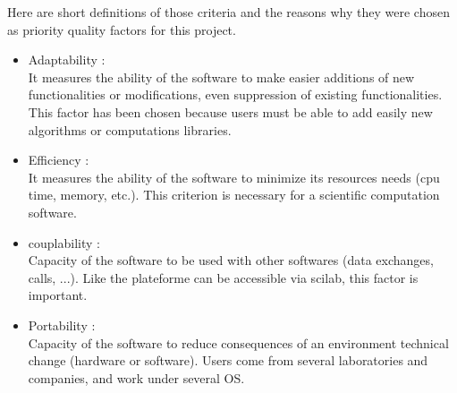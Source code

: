 Here are short definitions of those criteria and the reasons why they were chosen as priority quality factors for this project.

\begin{itemize}
\item   Adaptability : \\
        It measures the ability of the software to make easier additions of new functionalities or modifications, even suppression of existing functionalities. This factor has been chosen because users must be able to add easily new algorithms or computations libraries. 
\item   Efficiency : \\
        It measures the ability of the software to minimize its resources needs (cpu time, memory, etc.).
        This criterion is necessary for a scientific computation software.
\item   couplability : \\
        Capacity of the software to be used with other softwares (data exchanges, calls, ...).
        Like the plateforme can be accessible via \ac{scilab}, this factor is important.
\item   Portability : \\
        Capacity of the software to reduce consequences of an environment technical change (hardware or software).
        Users come from several laboratories and companies, and work under several OS.
\end{itemize}
        
        


